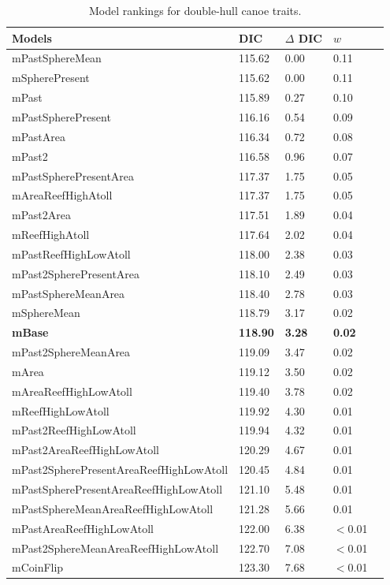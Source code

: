 \begin{table}
\begin{center}
\begin{tabular}{lllll}
Models & DIC & $\Delta$ DIC & $w$\\
\hline
mPastSphereMean & 115.62 & 0.00 & 0.11\\
mSpherePresent & 115.62 & 0.00 & 0.11\\
mPast & 115.89 & 0.27 & 0.10\\
mPastSpherePresent & 116.16 & 0.54 & 0.09\\
mPastArea & 116.34 & 0.72 & 0.08\\
mPast2 & 116.58 & 0.96 & 0.07\\
mPastSpherePresentArea & 117.37 & 1.75 & 0.05\\
mAreaReefHighAtoll & 117.37 & 1.75 & 0.05\\
mPast2Area & 117.51 & 1.89 & 0.04\\
mReefHighAtoll & 117.64 & 2.02 & 0.04\\
mPastReefHighLowAtoll & 118.00 & 2.38 & 0.03\\
mPast2SpherePresentArea & 118.10 & 2.49 & 0.03\\
mPastSphereMeanArea & 118.40 & 2.78 & 0.03\\
mSphereMean & 118.79 & 3.17 & 0.02\\
\textbf{mBase} & \textbf{118.90} & \textbf{3.28} & \textbf{0.02}\\
mPast2SphereMeanArea & 119.09 & 3.47 & 0.02\\
mArea & 119.12 & 3.50 & 0.02\\
mAreaReefHighLowAtoll & 119.40 & 3.78 & 0.02\\
mReefHighLowAtoll & 119.92 & 4.30 & 0.01\\
mPast2ReefHighLowAtoll & 119.94 & 4.32 & 0.01\\
mPast2AreaReefHighLowAtoll & 120.29 & 4.67 & 0.01\\
mPast2SpherePresentAreaReefHighLowAtoll & 120.45 & 4.84 & 0.01\\
mPastSpherePresentAreaReefHighLowAtoll & 121.10 & 5.48 & 0.01\\
mPastSphereMeanAreaReefHighLowAtoll & 121.28 & 5.66 & 0.01\\
mPastAreaReefHighLowAtoll & 122.00 & 6.38 & $<$0.01\\
mPast2SphereMeanAreaReefHighLowAtoll & 122.70 & 7.08 & $<$0.01\\
mCoinFlip & 123.30 & 7.68 & $<$0.01\\
\end{tabular}
\end{center}
\caption{Model rankings for double-hull canoe traits.
\label{resultstable3}}
\end{table}


